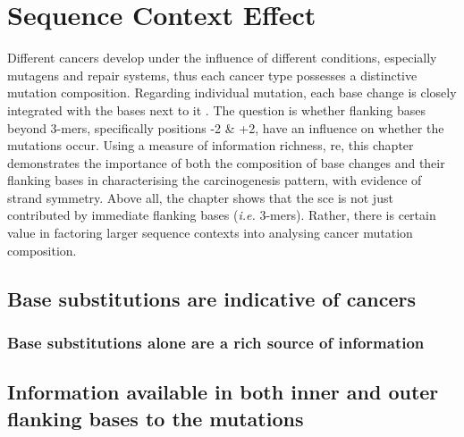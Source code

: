 \chapter{Sequence Context Effect}\label{sce}

Different cancers develop under the influence of different conditions, especially mutagens and repair systems, thus each cancer type possesses a distinctive mutation composition. Regarding individual mutation, each base change is closely integrated with the bases next to it \citep{Zhu2017,Zhu2020,Vinson2012CGMethylation}. The question is whether flanking bases beyond 3-mers, specifically positions -2 \& +2, have an influence on whether the mutations occur. Using a measure of information richness, \gls{re}, this chapter demonstrates the importance of both the composition of base changes and their flanking bases in characterising the carcinogenesis pattern, with evidence of strand symmetry. Above all, the chapter shows that the \gls{sce} is not just contributed by immediate flanking bases (\textit{i.e.} 3-mers). Rather, there is certain value in factoring larger sequence contexts into analysing cancer mutation composition.

\section{Base substitutions are indicative of cancers}

\subsection{Base substitutions alone are a rich source of information}


\section{Information available in both inner and outer flanking bases to the mutations}